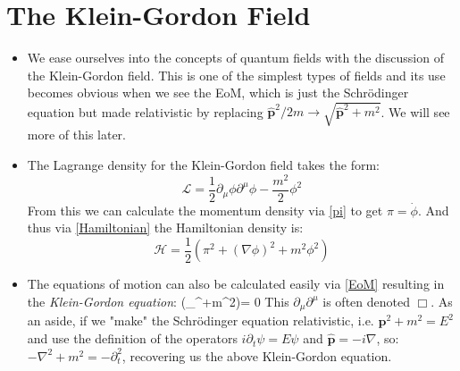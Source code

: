 \documentclass[11pt]{article}
\renewenvironment{flalign}{\vspace{-2mm}\empheq[box=\tcbhighmath]{align}}{\endempheq}
\numberwithin{equation}{section}
\begin{document}
\section{The Klein-Gordon Field}
\begin{itemize}
  \item We ease ourselves into the concepts of quantum fields with the discussion of the Klein-Gordon field. This is one of the simplest types of fields and its use becomes obvious when we see the EoM, which is just the Schr\"odinger equation but made relativistic by replacing $\hat{\textbf{p}}^2/2m \rightarrow \sqrt{\hat{\textbf{p}}^2 + m^2}$. We will see more of this later.

     \item The Lagrange density for the Klein-Gordon field takes the form:
     \begin{equation}
       \label{KG field}
       \mathcal{L} = \frac{1}{2}\partial_{\mu} \phi \partial^{\mu}\phi -\frac{m^2}{2}\phi^2
     \end{equation}   
From this we can calculate the momentum density via \ref{pi} to get $\pi = \dot{\phi}$. And thus via \ref{Hamiltonian} the Hamiltonian density is:
\begin{equation}
\label{KG_Ham}
  \mathcal{H} = \frac{1}{2}\left(\pi^2 +(\nabla\phi)^2+m^2\phi^2\right) 
\end{equation}
\item The equations of motion can also be calculated easily via \ref{EoM} resulting in the \emph{Klein-Gordon equation}:
\begin{flalign}
\label{KG eq}
  (\partial_{\mu}\partial^{\mu}+m^2)\phi  = 0
\end{flalign} 
This $\partial_{\mu}\partial^{\mu}$ is often denoted $\Box$. As an aside, if we "make" the Schr\"odinger equation relativistic, i.e. $\textbf{p}^2 + m^2 = E^2$ and use the definition of the operators $ i\partial_t\psi= E\psi $ and $\hat{\textbf{p}} = -i\nabla$, so:  $-\nabla^2 + m^2 = -\partial^2_t$, recovering us the above Klein-Gordon equation.  
\end{itemize}
\end{document}
